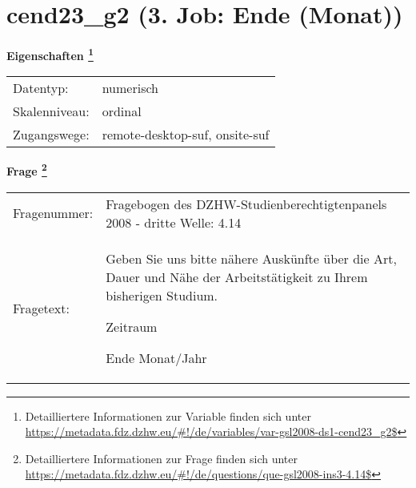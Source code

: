 
    \setcounter{footnote}{0}

    \vspace*{-1.8cm}
	\section{cend23\_g2 (3. Job: Ende (Monat))}
	\label{section:cend23_g2}



    \vspace*{0.5cm}
    \noindent\textbf{Eigenschaften
	\footnote{Detailliertere Informationen zur Variable finden sich unter
		\url{https://metadata.fdz.dzhw.eu/\#!/de/variables/var-gsl2008-ds1-cend23_g2$}}}\\
	\begin{tabularx}{\hsize}{@{}lX}
	Datentyp: & numerisch \\
	Skalenniveau: & ordinal \\
	Zugangswege: &
	  remote-desktop-suf, 
	  onsite-suf
 \\
    \end{tabularx}



				\vspace*{0.5cm}
                \noindent\textbf{Frage
	                \footnote{Detailliertere Informationen zur Frage finden sich unter
		              \url{https://metadata.fdz.dzhw.eu/\#!/de/questions/que-gsl2008-ins3-4.14$}}}\\
				\begin{tabularx}{\hsize}{@{}lX}
					Fragenummer: &
					  Fragebogen des DZHW-Studienberechtigtenpanels 2008 - dritte Welle:
					  4.14
 \\
					Fragetext: & Geben Sie uns bitte nähere Auskünfte über die Art, Dauer und Nähe der Arbeitstätigkeit zu Ihrem bisherigen Studium.\par  Zeitraum\par  Ende Monat/Jahr \\
				\end{tabularx}





